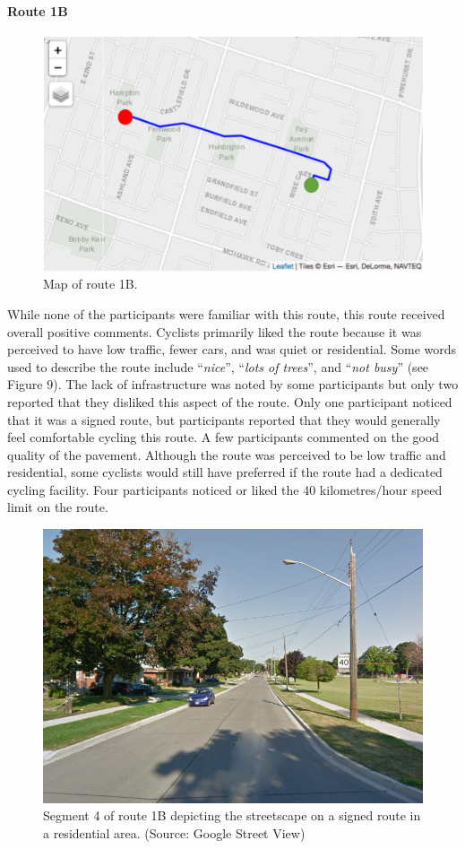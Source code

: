 \documentclass[]{elsarticle} %
\begin{document}
\hypertarget{route-1b}{%
\paragraph{Route 1B}\label{route-1b}}

\begin{figure}

{\centering \includegraphics[width=0.65\linewidth]{Route 1B} 

}

\caption{Map of route 1B.}\label{fig:figure-8}
\end{figure}

While none of the participants were familiar with this route, this route
received overall positive comments. Cyclists primarily liked the route
because it was perceived to have low traffic, fewer cars, and was quiet
or residential. Some words used to describe the route include
``\emph{nice}'', ``\emph{lots of trees}'', and ``\emph{not busy}'' (see
Figure 9). The lack of infrastructure was noted by some participants but
only two reported that they disliked this aspect of the route. Only one
participant noticed that it was a signed route, but participants
reported that they would generally feel comfortable cycling this route.
A few participants commented on the good quality of the pavement.
Although the route was perceived to be low traffic and residential, some
cyclists would still have preferred if the route had a dedicated cycling
facility. Four participants noticed or liked the 40 kilometres/hour
speed limit on the route.

\begin{figure}

{\centering \includegraphics[width=0.65\linewidth]{Figure 9} 

}

\caption{Segment 4 of route 1B depicting the streetscape on a signed route in a residential area. (Source: Google Street View)}\label{fig:figure-9}
\end{figure}
\end{document}
